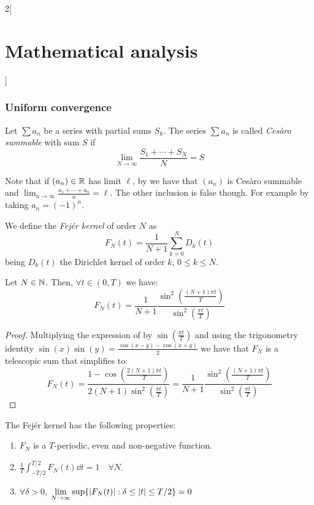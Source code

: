 \documentclass[../../../main_math.tex]{subfiles}
\begin{document}
\begin{multicols}{2}[\section{Mathematical analysis}]
  \subsubsection{Uniform convergence}
  \begin{definition}\label{MA:cesaro}
    Let $\sum a_n$ be a series with partial sums $S_k$. The series $\sum a_n$ is called \emph{Cesàro summable} with sum $S$ if $$\lim_{N\to\infty}\frac{S_1+\cdots+S_N}{N}=S$$
  \end{definition}
  \begin{remark}
    Note that if $(a_n)\in\mathbb{R}$ has limit $\ell$, by  we have that $(a_n)$ is Cesàro summable and $\displaystyle\lim_{n\to\infty}\frac{a_1+\cdots+a_n}{n}=\ell$. The other inclusion is false though. For example by taking $a_n={(-1)}^n$.
  \end{remark}
  \begin{definition}\label{MA:fejerdef}
    We define the \emph{Fejér kernel} of order $N$ as $$F_N(t)=\frac{1}{N+1}\sum_{k=0}^ND_k(t)$$ being $D_k(t)$ the Dirichlet kernel of order $k$, $0\leq k\leq N$.
  \end{definition}
  \begin{lemma}\label{MA:fejerkernelchar}
    Let $N\in\mathbb{N}$. Then, $\forall t\in(0,T)$ we have:
    $$F_N(t)=\frac{1}{N+1}\frac{\sin^2\left(\frac{(N+1)\pi t}{T}\right)}{\sin^2\left(\frac{\pi t}{T}\right)}$$
  \end{lemma}
  \begin{proof}
    Multiplying the expression of  by $\sin(\frac{\pi t}{T})$ and using the trigonometry identity $\sin(x)\sin(y)=\frac{\cos(x-y)-\cos(x+y)}{2}$ we have that $F_N$ is a telescopic sum that simplifies to:
    $$F_N(t)=\frac{1-\cos(\frac{2(N+1)\pi t}{T})}{2(N+1)\sin^2\left(\frac{\pi t}{T}\right)}=\frac{1}{N+1}\frac{\sin^2\left(\frac{(N+1)\pi t}{T}\right)}{\sin^2\left(\frac{\pi t}{T}\right)}$$
  \end{proof}
  \begin{proposition}\label{MA:fejerprop}
    The Fejér kernel has the following properties:
    \begin{enumerate}
      \item $F_N$ is a $T$-periodic, even and non-negative function.
      \item $\displaystyle\frac{1}{T}\int_{-T/2}^{T/2}F_N(t)\dd{t}=1\quad\forall N$.
      \item $\forall\delta>0$, $\displaystyle\lim_{N\to\infty}\sup\{\abs{F_N(t)}:\delta\leq\abs{t}\leq T/2\}=0$

\end{enumerate}
\end{proposition}
\end{multicols}
\end{document}
